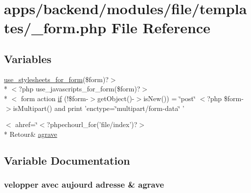 \hypertarget{backend_2modules_2file_2templates_2__form_8php}{\section{apps/backend/modules/file/templates/\-\_\-form.php File Reference}
\label{backend_2modules_2file_2templates_2__form_8php}
}
\subsection*{Variables}
\begin{DoxyCompactItemize}
\item 
\hyperlink{live_2modules_2user_2templates_2__form_8php_a86bc4522fdbe625b07bc4a4d6eec3df7}{use\-\_\-stylesheets\-\_\-for\-\_\-form}(\$form)?$>$\\*
$<$?php use\-\_\-javascripts\-\_\-for\-\_\-form(\$form)?$>$\\*
$<$ form action \hyperlink{backend_2modules_2file_2templates_2__form_8php_abd1acf0179bbb4a56e04d4fccdbc121f}{if} (!\$form-\/$>$get\-Object()-\/$>$is\-New()) = \char`\"{}post\char`\"{} $<$?php \$form-\/$>$is\-Multipart() and print 'enctype=\char`\"{}multipart/form-\/data\char`\"{} '
\item 
$<$ ahref=\char`\"{}$<$?phpechourl\-\_\-for('file/index')?$>$\\*
 Retour\& \hyperlink{backend_2modules_2file_2templates_2__form_8php_ad03790e1760c16bd33104fd13fad936b}{agrave}
\end{DoxyCompactItemize}


\subsection{Variable Documentation}
\hypertarget{backend_2modules_2file_2templates_2__form_8php_ad03790e1760c16bd33104fd13fad936b}{
\subsubsection[{agrave}]{\setlength{\rightskip}{0pt plus 5cm}velopper avec aujourd adresse \& agrave}}\label{backend_2modules_2file_2templates_2__form_8php_ad03790e1760c16bd33104fd13fad936b}


